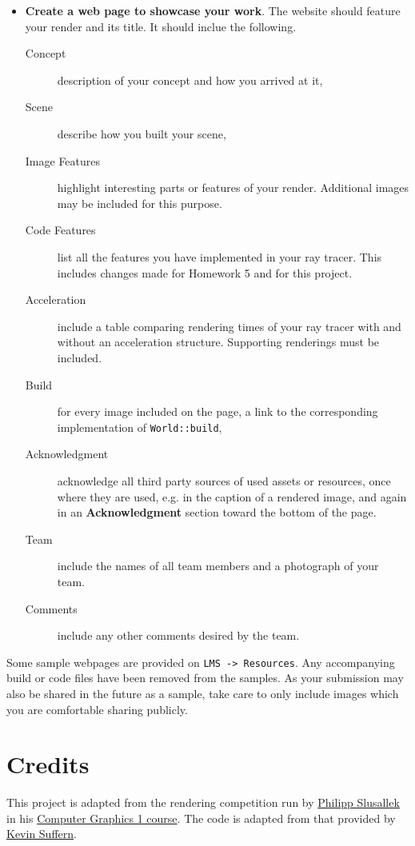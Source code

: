 \documentclass[addpoints]{exam}
\begin{document}
\begin{questions}
\begin{itemize}
  \item \textbf{Create a web page to showcase your work}. The website should feature your render and its title. It should inclue the following.
    \begin{description}
    \item[Concept] description of your concept and how you arrived at it,
    \item[Scene] describe how you built your scene,
    \item[Image Features] highlight interesting parts or features of your render. Additional images may be included for this purpose.
    \item[Code Features] list all the features you have implemented in your ray tracer. This includes changes made for Homework 5 and for this project.
    \item[Acceleration] include a table comparing rendering times of your ray tracer with and without an acceleration structure. Supporting renderings must be included.
    \item[Build] for every image included on the page, a link to the corresponding implementation of {\tt World::build},
    \item[Acknowledgment] acknowledge all third party sources of used assets or resources, once where they are used, e.g. in the caption of a rendered image, and again in an \textbf{Acknowledgment} section toward the bottom of the page.
    \item[Team] include the names of all team members and a photograph of your team.
    \item[Comments] include any other comments desired by the team.
    \end{description}
  \end{itemize}

  Some sample webpages are provided on \texttt{LMS -> Resources}. Any accompanying build or code files have been removed from the samples. As your submission may also be shared in the future as a sample, take care to only include images which you are comfortable sharing publicly.
  
\end{questions}

\section*{Credits}

This project is adapted from the rendering competition run by \href{https://graphics.cg.uni-saarland.de/people/slusallek.html}{Philipp Slusallek} in his \href{https://graphics.cg.uni-saarland.de/courses/cg1-2019/}{Computer Graphics 1 course}. The code is adapted from that provided by \href{http://www.raytracegroundup.com/}{Kevin Suffern}.
\end{document}
